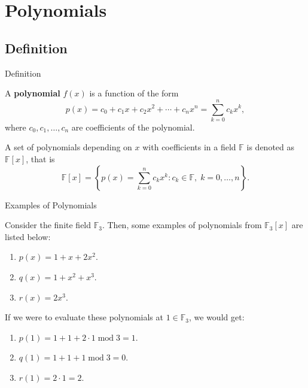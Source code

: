 \documentclass{beamer}
\begin{document}
    \section{Polynomials}

    \subsection{Definition}

    \begin{frame}{Definition}
      \begin{definition}
        A \textbf{polynomial} $f(x)$ is a function of the form
        \begin{equation*}
            p(x) = c_0 + c_1 x + c_2 x^2 + \cdots + c_n x^n = \sum_{k=0}^{n} c_k x^k,
        \end{equation*}
        where $c_0, c_1, \dots, c_n$ are coefficients of the polynomial.
    \end{definition}
    
    \begin{definition}
        A set of polynomials depending on $x$ with coefficients in a field $\mathbb{F}$ is denoted as $\mathbb{F}[x]$, that is
        \begin{equation*}
            \mathbb{F}[x] = \left\{p(x) = \sum_{k=0}^{n} c_k x^k: c_k \in \mathbb{F}, \; k = 0,\dots,n\right\}.
        \end{equation*}
    \end{definition}
    \end{frame}

    \begin{frame}{Examples of Polynomials}
      \begin{example}
        Consider the finite field $\mathbb{F}_3$. Then, some examples of polynomials from $\mathbb{F}_3[x]$ are listed below:
        \begin{enumerate}
            \item $p(x) = 1 + x + 2x^2$.
            \item $q(x) = 1 + x^2 + x^3$.
            \item $r(x) = 2x^3$.
        \end{enumerate}
    
       If we were to evaluate these polynomials at $1 \in \mathbb{F}_3$, we would get:
        \begin{enumerate}
            \item $p(1) = 1 + 1 + 2 \cdot 1 \; \text{mod} \; 3 = 1$.
            \item $q(1) = 1 + 1 + 1 \; \text{mod} \; 3 = 0$.
            \item $r(1) = 2 \cdot 1 = 2$.
        \end{enumerate}
    \end{example}
    \end{frame}    
\end{document}
